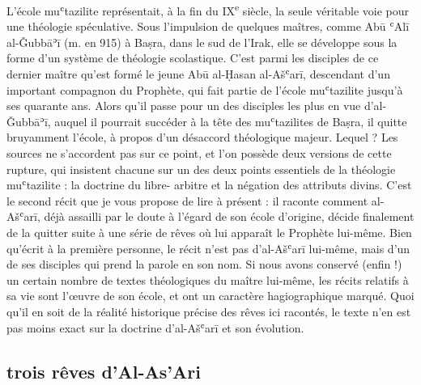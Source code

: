 L'école muʿtazilite représentait, à la fin du IX\textsuperscript{e}
siècle, la seule véritable voie pour une théologie spéculative. Sous
l'impulsion de quelques maîtres, comme Abū ʿAlī al-Ǧubbāʾī (m. en 915) à
Baṣra, dans le sud de l'Irak, elle se développe sous la forme d'un
système de théologie scolastique. C'est parmi les disciples de ce
dernier maître qu'est formé le jeune Abū al-Ḥasan al-Ašʿarī, descendant
d'un important compagnon du Prophète, qui fait partie de l'école
muʿtazilite jusqu'à ses quarante ans. Alors qu'il passe pour un des
disciples les plus en vue d'al-Ǧubbāʾī, auquel il pourrait succéder à la
tête des muʿtazilites de Baṣra, il quitte bruyamment l'école, à propos
d'un désaccord théologique majeur. Lequel ? Les sources ne s'accordent
pas sur ce point, et l'on possède deux versions de cette rupture, qui
insistent chacune sur un des deux points essentiels de la théologie
muʿtazilite : la doctrine du libre- arbitre et la négation des attributs
divins. C'est le second récit que je vous propose de lire à présent : il
raconte comment al-Ašʿarī, déjà assailli par le doute à l'égard de son
école d'origine, décide finalement de la quitter suite à une série de
rêves où lui apparaît le Prophète lui-même. Bien qu'écrit à la première
personne, le récit n'est pas d'al-Ašʿarī lui-même, mais d'un de ses
disciples qui prend la parole en son nom. Si nous avons conservé (enfin
!) un certain nombre de textes théologiques du maître lui-même, les
récits relatifs à sa vie sont l'œuvre de son école, et ont un caractère
hagiographique marqué. Quoi qu'il en soit de la réalité historique
précise des rêves ici racontés, le texte n'en est pas moins exact sur la
doctrine d'al-Ašʿarī et son évolution.




\subsection{trois rêves d'Al-As'Ari} 


